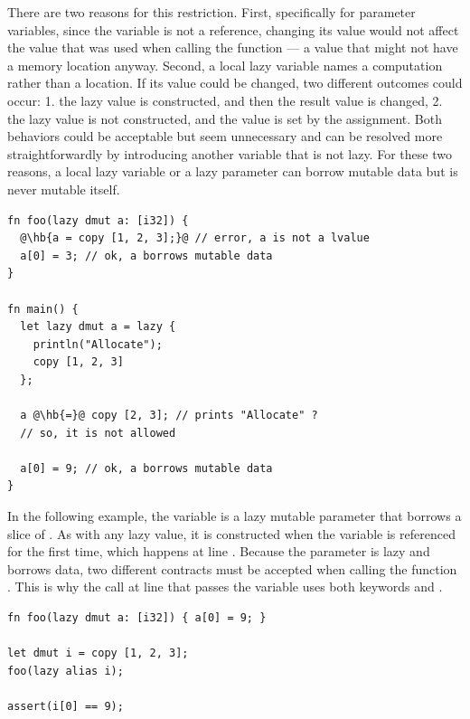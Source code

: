 There are two reasons for this restriction. First, specifically for parameter
variables, since the variable is not a reference, changing its value would not
affect the value that was used when calling the function — a value that might
not have a memory location anyway. Second, a local lazy variable names a
computation rather than a location. If its value could be changed, two different
outcomes could occur: 1. the lazy value is constructed, and then the result
value is changed, 2. the lazy value is not constructed, and the value is set by
the assignment. Both behaviors could be acceptable but seem unnecessary and can
be resolved more straightforwardly by introducing another variable that is not
lazy. For these two reasons, a local lazy variable or a lazy parameter can
borrow mutable data but is never mutable itself.

\begin{lstlisting}[style=coloredverbatimError, escapechar=@]
fn foo(lazy dmut a: [i32]) {
  @\hb{a = copy [1, 2, 3];}@ // error, a is not a lvalue
  a[0] = 3; // ok, a borrows mutable data
}

fn main() {
  let lazy dmut a = lazy {
    println("Allocate");
    copy [1, 2, 3]
  };

  a @\hb{=}@ copy [2, 3]; // prints "Allocate" ?
  // so, it is not allowed

  a[0] = 9; // ok, a borrows mutable data
}
\end{lstlisting}

In the following example, the variable  is a lazy mutable parameter
that borrows a slice of . As with any lazy value, it is constructed
when the variable  is referenced for the first time, which happens at
line . Because the parameter  is lazy and borrows data, two
different contracts must be accepted when calling the function . This
is why the call at line  that passes the variable  uses both
keywords  and .

\begin{lstlisting}[style=coloredverbatim, caption=Example of lazy mutable parameter]
fn foo(lazy dmut a: [i32]) { a[0] = 9; }

let dmut i = copy [1, 2, 3];
foo(lazy alias i);

assert(i[0] == 9);
\end{lstlisting}


\vfill%
\pagebreak
